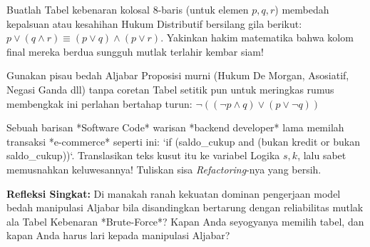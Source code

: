 \documentclass[../main]{subfiles}
\begin{document}

\begin{latihan}
  \item Buatlah Tabel kebenaran kolosal 8-baris (untuk elemen $p, q, r$) membedah kepalsuan atau kesahihan Hukum Distributif bersilang gila berikut: $p \vee (q \wedge r) \equiv (p \vee q) \wedge (p \vee r)$. Yakinkan hakim matematika bahwa kolom final mereka berdua sungguh mutlak terlahir kembar siam!
  \item Gunakan pisau bedah Aljabar Proposisi murni (Hukum De Morgan, Asosiatif, Negasi Ganda dll) tanpa coretan Tabel setitik pun untuk meringkas rumus membengkak ini perlahan bertahap turun:
  $\neg( (\neg p \wedge q) \vee (p \vee \neg q) )$
  \item Sebuah barisan *Software Code* warisan *backend developer* lama memilah transaksi *e-commerce* seperti ini: 
  `if (saldo\_cukup and (bukan kredit or bukan saldo\_cukup))`. 
  Translasikan teks kusut itu ke variabel Logika $s, k$, lalu sabet memusnahkan keluwesannya! Tuliskan sisa \textit{Refactoring}-nya yang bersih.
  \item \textbf{Refleksi Singkat:} Di manakah ranah kekuatan dominan pengerjaan model bedah manipulasi Aljabar bila disandingkan bertarung dengan reliabilitas mutlak ala Tabel Kebenaran *Brute-Force*? Kapan Anda seyogyanya memilih tabel, dan kapan Anda harus lari kepada manipulasi Aljabar?
\end{latihan}

\end{document}
